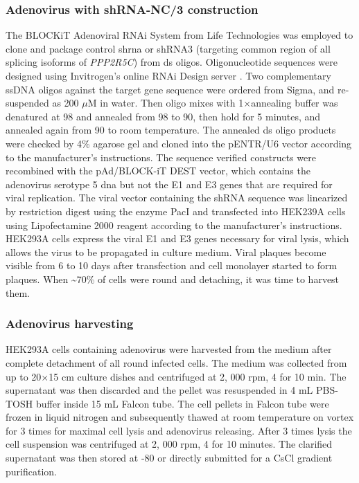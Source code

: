 \subsubsection{Adenovirus with shRNA-NC{\slash}3 construction}
The BLOCKiT\textsuperscript{\texttrademark} Adenoviral RNAi System from Life Technologies was employed to clone and package control \gls{shrna} or shRNA3 (targeting common region of all splicing isoforms of \textit{PPP2R5C}) from ds oligos. Oligonucleotide sequences were designed using Invitrogen’s online RNAi Design server \cite{_invitrogen_2014}. Two complementary ssDNA oligos against the target gene sequence were ordered from Sigma, and re-suspended as 200 $\mu$M in water. Then oligo mixes with 1$\times$annealing buffer was denatured at 98{\celsius} and annealed from 98{\celsius} to 90{\celsius}, then hold for 5 minutes, and annealed again from 90{\celsius} to room temperature. The annealed ds oligo products were checked by 4\% agarose gel and cloned into the pENTR\textsuperscript{\texttrademark}{\slash}U6 vector according to the manufacturer’s instructions. The sequence verified constructs were recombined with the pAd{\slash}BLOCK-iT\textsuperscript{\texttrademark} DEST vector, which contains the adenovirus serotype 5 \gls{dna} but not the E1 and E3 genes that are required for viral replication. The viral vector containing the shRNA sequence was linearized by restriction digest using the enzyme PacI and transfected into HEK239A cells using Lipofectamine 2000 reagent according to the manufacturer’s instructions. HEK293A cells express the viral E1 and E3 genes necessary for viral lysis, which allows the virus to be propagated in culture medium. Viral plaques become visible from 6 to 10 days after transfection and cell monolayer started to form plaques. When \textasciitilde70\% of cells were round and detaching, it was time to harvest them.

\subsubsection{Adenovirus harvesting}\label{sec:sec4412}
HEK293A cells containing adenovirus were harvested from the medium after complete detachment of all round infected cells. The medium was collected from up to 20$\times$15 cm culture dishes and centrifuged at 2, 000 rpm, 4\celsius{} for 10 min. The supernatant was then discarded and the pellet was resuspended in 4 mL PBS-TOSH buffer inside 15 mL Falcon tube. The cell pellets in Falcon tube were frozen in liquid nitrogen and subsequently thawed at room temperature on vortex for 3 times for maximal cell lysis and adenovirus releasing. After 3 times lysis the cell suspension was centrifuged at 2, 000 rpm, 4{\celsius} for 10 minutes. The clarified supernatant was then stored at -80{\celsius} or directly submitted for a CsCl gradient purification.

